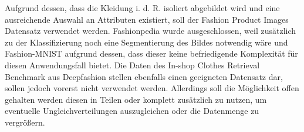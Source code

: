 \begin{table}[H]
\centering
{}
\caption{Vergleich verschiedener Fashion-Datensätze}
\label{tab:compareSets}
\end{table}

Aufgrund dessen, dass die Kleidung i. d. R. isoliert abgebildet wird und eine ausreichende Auswahl an Attributen existiert, soll der Fashion Product Images Datensatz verwendet werden. Fashionpedia wurde ausgeschlossen, weil zusätzlich zu der Klassifizierung noch eine Segmentierung des Bildes notwendig wäre und Fashion-MNIST aufgrund dessen, dass dieser keine befriedigende Komplexität für diesen Anwendungsfall bietet. Die Daten des In-shop Clothes Retrieval Benchmark aus Deepfashion stellen ebenfalls einen geeigneten Datensatz dar, sollen jedoch vorerst nicht verwendet werden. Allerdings soll die Möglichkeit offen gehalten werden diesen in Teilen oder komplett zusätzlich zu nutzen, um eventuelle Ungleichverteilungen auszugleichen oder die Datenmenge zu vergrößern.

